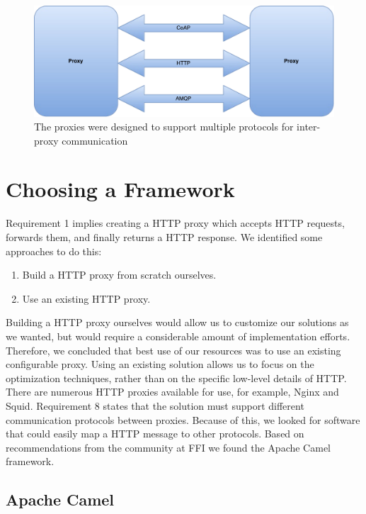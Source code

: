\begin{figure}[h]
\includegraphics[scale=0.5]{images/proxy_communcation.pdf}
\caption{The proxies were designed to support multiple protocols for inter-proxy communication}
\label{figure:proxy-communication}
\end{figure}


\section{Choosing a Framework}

Requirement 1 implies creating a HTTP proxy which accepts HTTP requests,
forwards them, and finally returns a HTTP response. We identified some
approaches to do this:

\begin{enumerate}
    \item Build a HTTP proxy from scratch ourselves.
    \item Use an existing HTTP proxy.
\end{enumerate}

Building a HTTP proxy ourselves would allow us to customize our solutions as we
wanted, but would require a considerable amount of implementation efforts.
Therefore, we concluded that best use of our resources was to use an existing
configurable proxy. Using an existing solution allows us to focus on the
optimization techniques, rather than on the specific low-level details of HTTP.
There are numerous HTTP proxies available for use, for example,
Nginx\cite{nginx-homepage} and Squid\cite{squid-homepage}. Requirement 8 states
that the solution must support different communication protocols between
proxies. Because of this, we looked for software that could easily map a HTTP
message to other protocols. Based on recommendations from the community at FFI
we found the Apache Camel framework.

\subsection{Apache Camel}

